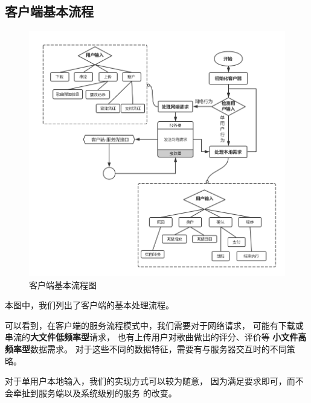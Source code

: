 \subsection{客户端基本流程}
\begin{figure}[h!]
\centering
\includegraphics[width=15cm]{images/do_3}
\caption{客户端基本流程图}
\end{figure}

本图中，我们列出了客户端的基本处理流程。

可以看到，在客户端的服务流程模式中，我们需要对于网络请求，
可能有下载或串流的\textbf{大文件低频率型}请求，
也有上传用户对歌曲做出的评分、评价等
\textbf{小文件高频率型}数据需求。
对于这些不同的数据特征，需要有与服务器交互时的不同策略。

对于单用户本地输入，我们的实现方式可以较为随意，
因为满足要求即可，而不会牵扯到服务端以及系统级别的服务
的改变。

\newpage
